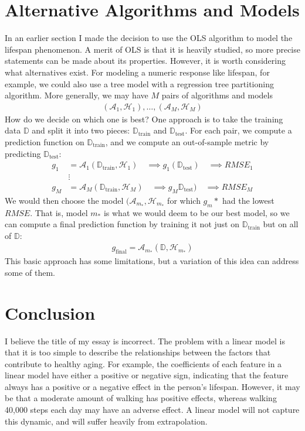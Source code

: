 \documentclass[12pt]{article}
\begin{document}
	 \section{Alternative Algorithms and Models}
	 In an earlier section I made the decision to use the OLS algorithm
	 to model the lifespan phenomenon. A merit of OLS is that it is
	 heavily studied, so more precise statements can be made about its
	 properties. However, it is worth considering what alternatives exist.
	 For modeling a numeric response like lifespan, for example, we could
	 also use a tree model with a regression tree partitioning algorithm.
	 More generally, we may have $M$ pairs of algorithms and models
	 \begin{align*}
	 	(\mathcal{A}_1,\mathcal{H}_1),\ldots,(\mathcal{A}_M, \mathcal{H}_M)
	 \end{align*}
	 How do we decide on which one is best? One approach is to take the
	 training data $\mathbb{D}$ and split it into two pieces: $\mathbb{D}_{\text{train}}$
	 and $\mathbb{D}_{\text{test}}$. For each pair, we compute a prediction function
	 on $\mathbb{D}_{\text{train}}$, and we compute an out-of-sample metric
	 by predicting $\mathbb{D}_{\text{test}}$:
	 \begin{align*}
	 	g_1 &= \mathcal{A}_1(\mathbb{D}_{\text{train}}, \mathcal{H}_1)\quad
	 	\implies g_1(\mathbb{D}_{\text{test}})\quad \implies RMSE_1\\
	 	&\vdots \\ 
	 	g_M &= \mathcal{A}_M(\mathbb{D}_{\text{train}}, \mathcal{H}_M)\quad
	 	\implies g_M\mathbb{D}_{\text{test}})\quad \implies RMSE_M
	 \end{align*}
	 We would then choose the model $(\mathcal{A}_{m_*}, \mathcal{H}_{m_*}$
	 for which $g_m*$ had the lowest $RMSE$. That is, model $m_*$ is what
	 we would deem to be our best model, so we can compute a final prediction
	 function by training it not just on $\mathbb{D}_{\text{train}}$ but on
	 all of $\mathbb{D}$:
	 \begin{align*}
	 	g_{\text{final}} = \mathcal{A}_{m_*}(\mathbb{D}, \mathcal{H}_{m_*})
	 \end{align*}
	 This basic approach has some limitations, but a variation of this idea
	 can address some of them.
	 \section{Conclusion}
	 I believe the title of my essay is incorrect. The problem with a linear model
	 is that it is too simple to describe the relationships between the factors
	 that contribute to healthy aging. For example, the coefficients of each
	 feature in a linear model have either a positive or negative sign, indicating
	 that the feature always has a positive or a negative effect in the person's
	 lifespan. However, it may be that a moderate amount of walking has positive
	 effects, whereas walking 40,000 steps each day may have an adverse effect.
	 A linear model will not capture this dynamic, and will suffer heavily from
	 extrapolation.
	 
	\pagebreak
	\printbibliography
	
\end{document}
